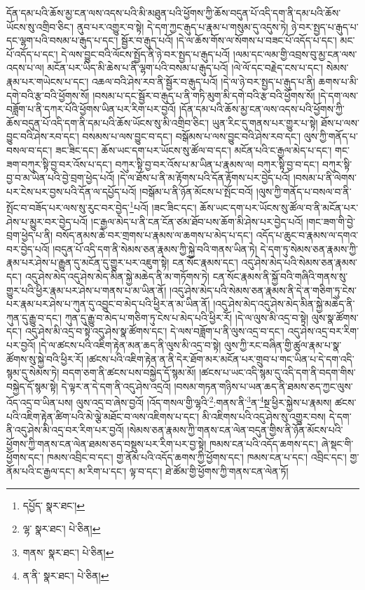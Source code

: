 དོན་དམ་པའི་ཆོས་མྱ་ངན་ལས་འདས་པའི་མི་མཐུན་པའི་ཕྱོགས་ཀྱི་ཆོས་བདུན་པོ་འདི་དག་ནི་དམ་པའི་ཆོས་ཡོངས་སུ་འགྲིབ་ཅིང་། ནུབ་པར་འགྱུར་བ་སྟེ། དེ་དག་ཀྱང་རྒུད་པ་རྣམ་པ་གསུམ་དུ་འདུས་ཏེ། ཉེ་བར་སྤྱད་པ་རྒུད་པ་དང་ལྷག་པའི་བསམ་པ་རྒུད་པ་དང་། སྦྱོར་བ་རྒུད་པའོ། །དེ་ལ་ཆོས་གོས་ལ་སོགས་པ་བཟང་པོ་འདོད་པ་དང་། མང་པོ་འདོད་པ་དང་། དེ་ལས་བྱུང་བའི་ལོངས་སྤྱོད་ནི་ཉེ་བར་སྤྱད་པ་རྒུད་པའོ། །ལམ་དང་ལམ་གྱི་འབྲས་བུ་མྱ་ངན་ལས་འདས་པ་ལ། མངོན་པར་ཡིད་མི་ཆེས་པ་ནི་ལྷག་པའི་བསམ་པ་རྒུད་པའོ། །ལེ་ལོ་དང་བརྗེད་ངས་པ་དང་། སེམས་རྣམ་པར་གཡེངས་པ་དང་། འཆལ་བའི་ཤེས་རབ་ནི་སྦྱོར་བ་རྒུད་པའོ། །དེ་ལ་ཉེ་བར་སྤྱད་པ་རྒུད་པ་ནི། ཆགས་པ་མི་དགེ་བའི་རྩ་བའི་ཕྱོགས་སོ། །བསམ་པ་དང་སྦྱོར་བ་རྒུད་པ་ནི་གཏི་མུག་མི་དགེ་བའི་རྩ་བའི་ཕྱོགས་སོ། །དེ་དག་ལས་བཟློག་པ་ནི་དཀར་པོའི་ཕྱོགས་ཡིན་པར་རིག་པར་བྱའོ། །དོན་དམ་པའི་ཆོས་མྱ་ངན་ལས་འདས་པའི་ཕྱོགས་ཀྱི་ཆོས་བདུན་པོ་འདི་དག་ནི་དམ་པའི་ཆོས་ཡོངས་སུ་མི་འགྲིབ་ཅིང་། ཡུན་རིང་དུ་གནས་པར་གྱུར་པ་སྟེ། ཐོས་པ་ལས་བྱུང་བའི་ཤེས་རབ་དང་། བསམས་པ་ལས་བྱུང་བ་དང་། བསྒོམས་པ་ལས་བྱུང་བའི་ཤེས་རབ་དང་། ལུས་ཀྱི་གནོད་པ་བསལ་བ་དང་། ཟང་ཟིང་དང་། ཆོས་ཡང་དག་པར་ཡོངས་སུ་ཚོལ་བ་དང་། མངོན་པའི་ང་རྒྱལ་མེད་པ་དང་། གང་ཟག་བཀུར་སྟི་བྱ་བར་འོས་པ་དང་། བཀུར་སྟི་བྱ་བར་འོས་པ་མ་ཡིན་པ་རྣམས་ལ། བཀུར་སྟི་བྱ་བ་དང་། བཀུར་སྟི་བྱ་བ་མ་ཡིན་པའི་བྱེ་བྲག་ཕྱེད་པའོ། །དེ་ལ་ཐོས་པ་ནི་མ་རྟོགས་པའི་དོན་རྟོགས་པར་བྱེད་པའོ། །བསམ་པ་ནི་ལེགས་པར་ངེས་པར་བྱས་པའི་དོན་ལ་དཔྱོད་པའོ། །བསྒོམ་པ་ནི་ཉོན་མོངས་པ་སྤོང་བའོ། །ལུས་ཀྱི་གནོད་པ་བསལ་བ་ནི་སྤོང་བ་བཟོད་པར་ལས་སུ་རུང་བར་བྱེད་\footnote{དཔྱོད་  སྣར་ཐང་། }པའོ། །ཟང་ཟིང་དང་། ཆོས་ཡང་དག་པར་ཡོངས་སུ་ཚོལ་བ་ནི་མངོན་པར་ཤེས་པ་མྱུར་བར་བྱེད་པའོ། །ང་རྒྱལ་མེད་པ་ནི་ངན་ངོན་ཙམ་ཐོབ་པས་ཆོག་མི་ཤེས་པར་བྱེད་པའོ། །གང་ཟག་གི་བྱེ་བྲག་ཕྱེད་པ་ནི། བསོད་ནམས་ཆེ་བར་གྲགས་པ་རྣམས་ལ་ཆགས་པ་མེད་པ་དང་། འདོད་པ་ཆུང་བ་རྣམས་ལ་དགའ་བར་བྱེད་པའོ། །བདུན་པོ་འདི་དག་ནི་སེམས་ཅན་རྣམས་ཀྱི་སྐྱེ་བའི་གནས་ཡིན་ཏེ། དེ་དག་ཏུ་སེམས་ཅན་རྣམས་ཀྱི་རྣམ་པར་ཤེས་པ་རྒྱུན་དུ་མངོན་དུ་གྱུར་པར་འཇུག་སྟེ། ངན་སོང་རྣམས་དང་། འདུ་ཤེས་མེད་པའི་སེམས་ཅན་རྣམས་དང་། འདུ་ཤེས་མེད་འདུ་ཤེས་མེད་མིན་སྐྱེ་མཆེད་ནི་མ་གཏོགས་ཏེ། ངན་སོང་རྣམས་ནི་སྐྱོ་བའི་གཞིའི་གནས་སུ་གྱུར་པའི་ཕྱིར་རྣམ་པར་ཤེས་པ་གནས་པ་མ་ཡིན་ནོ། །འདུ་ཤེས་མེད་པའི་སེམས་ཅན་རྣམས་ནི་དེ་ན་གཅིག་ཏུ་ངེས་པར་རྣམ་པར་ཤེས་པ་ཀུན་དུ་འབྱུང་བ་མེད་པའི་ཕྱིར་ན་མ་ཡིན་ནོ། །འདུ་ཤེས་མེད་འདུ་ཤེས་མེད་མིན་སྐྱེ་མཆེད་ནི་ཀུན་དུ་རྒྱུ་བ་དང་། ཀུན་དུ་རྒྱུ་བ་མེད་པ་གཅིག་ཏུ་ངེས་པ་མེད་པའི་ཕྱིར་རོ། །དེ་ལ་ལུས་མི་འདྲ་བ་སྟེ། ལུས་སྣ་ཚོགས་དང་། འདུ་ཤེས་མི་འདྲ་བ་སྟེ་འདུ་ཤེས་སྣ་ཚོགས་དང་། དེ་ལས་བཟློག་པ་ནི་ལུས་འདྲ་བ་དང་། འདུ་ཤེས་འདྲ་བར་རིག་པར་བྱའོ། །དེ་ལ་ཚངས་པའི་འཇིག་རྟེན་མན་ཆད་ནི་ལུས་མི་འདྲ་བ་སྟེ། ལུས་ཀྱི་རང་བཞིན་གྱི་ཚུལ་རྣམ་པ་སྣ་ཚོགས་སུ་སྐྱེ་བའི་ཕྱིར་རོ། །ཚངས་པའི་འཇིག་རྟེན་ན་ནི་དེར་ཐོག་མར་མངོན་པར་གྲུབ་པ་གང་ཡིན་པ་དེ་དག་འདི་སྙམ་དུ་སེམས་ཏེ། བདག་ཅག་ནི་ཚངས་པས་བསྐྱེད་དོ་སྙམ་མོ། །ཚངས་པ་ཡང་འདི་སྙམ་དུ་འདི་དག་ནི་བདག་གིས་བསྐྱེད་དོ་སྙམ་སྟེ། དེ་ལྟར་ན་དེ་དག་ནི་འདུ་ཤེས་འདྲའོ། །བསམ་གཏན་གཉིས་པ་ཡན་ཆད་ནི་ཐམས་ཅད་ཀྱང་ལུས་འོད་འདྲ་བ་ཡིན་པས། ལུས་འདྲ་བ་ཞེས་བྱའོ། །འོད་གསལ་གྱི་ལྷའི་\footnote{ལྷ་  སྣར་ཐང་།  པེ་ཅིན། }:གནས་ནི་\footnote{གནས་  སྣར་ཐང་།  པེ་ཅིན། }ན་\footnote{ན་ནི་  སྣར་ཐང་།  པེ་ཅིན། }སྔ་ཕྱིར་སྐྱེས་པ་རྣམས། ཚངས་པའི་འཇིག་རྟེན་ཚིག་པའི་མེ་ལྕེ་མཐོང་བ་ལས་འཇིགས་པ་དང་། མི་འཇིགས་པའི་འདུ་ཤེས་སུ་འགྱུར་བས། དེ་དག་ནི་འདུ་ཤེས་མི་འདྲ་བར་རིག་པར་བྱའོ། །སེམས་ཅན་རྣམས་ཀྱི་གནས་ངན་ལེན་བདུན་གྱིས་ནི་ཉོན་མོངས་པའི་ཕྱོགས་ཀྱི་གནས་ངན་ལེན་ཐམས་ཅད་བསྡུས་པར་རིག་པར་བྱ་སྟེ། ཁམས་ངན་པའི་འདོད་ཆགས་དང་། ཞེ་སྡང་གི་ཕྱོགས་དང་། ཁམས་འབྲིང་བ་དང་། གྱ་ནོམ་པའི་འདོད་ཆགས་ཀྱི་ཕྱོགས་དང་། ཁམས་ངན་པ་དང་། འབྲིང་དང་། གྱ་ནོམ་པའི་ང་རྒྱལ་དང་། མ་རིག་པ་དང་། ལྟ་བ་དང་། ཐེ་ཚོམ་གྱི་ཕྱོགས་ཀྱི་གནས་ངན་ལེན་ཏོ། 